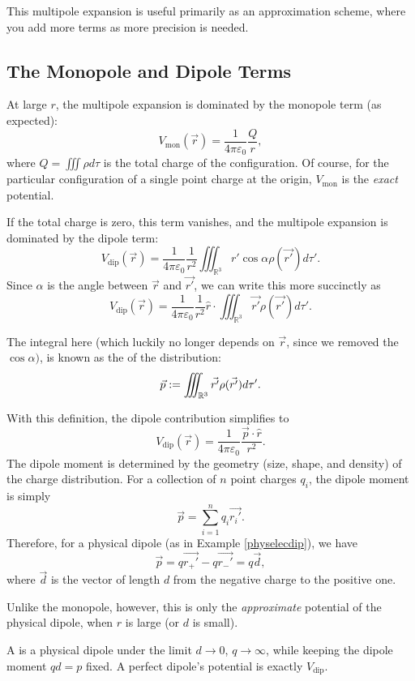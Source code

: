 This multipole expansion is useful primarily as an approximation scheme, where you add more terms as more precision is needed.

\subsection{The Monopole and Dipole Terms}

At large $r$, the multipole expansion is dominated by the monopole term (as expected):
\[V_{\text{mon}}(\vec{r})=\frac{1}{4\pi\varepsilon_0}\frac{Q}{r},\]
where $Q=\iiint \rho d\tau$ is the total charge of the configuration. Of course, for the particular configuration of a single point charge at the origin, $V_{\text{mon}}$ is the \textit{exact} potential.

If the total charge is zero, this term vanishes, and the multipole expansion is dominated by the dipole term:
\[V_{\text{dip}}(\vec{r})=\frac{1}{4\pi\varepsilon_0}\frac{1}{r^2}\iiint_{\mathbb{R}^3}r'\cos\alpha \rho(\vec{r'})d\tau'.\]
Since $\alpha$ is the angle between $\vec{r}$ and $\vec{r'}$, we can write this more succinctly as
\[V_{\text{dip}}(\vec{r})=\frac{1}{4\pi\varepsilon_0}\frac{1}{r^2}\hat{r}\cdot\iiint_{\mathbb{R}^3}\vec{r'}\rho(\vec{r'})d\tau'.\]

\begin{definition}
The integral here (which luckily no longer depends on $\vec{r}$, since we removed the $\cos\alpha)$, is known as the  of the distribution:
\[\vec{p}:=\iiint_{\mathbb R^3}\vec{r'}\rho(\vec{r'})d\tau'.\]
\end{definition}

With this definition, the dipole contribution simplifies to
\[V_{\text{dip}}(\vec{r})=\frac{1}{4\pi\varepsilon_0}\frac{\vec{p}\cdot\hat{r}}{r^2}.\]
The dipole moment is determined by the geometry (size, shape, and density) of the charge distribution. For a collection of $n$ point charges $q_i$, the dipole moment is simply
\[\vec{p}=\sum_{i=1}^n q_i\vec{r_i'}.\]
Therefore, for a physical dipole (as in Example \ref{physelecdip}), we have
\[\vec{p}=q\vec{r_+'}-q\vec{r_-'}=q\vec{d},\]
where $\vec{d}$ is the vector of length $d$ from the negative charge to the positive one.

Unlike the monopole, however, this is only the \textit{approximate} potential of the physical dipole, when $r$ is large (or $d$ is small). 

\begin{definition}
A  is a physical dipole under the limit $d\to 0$, $q\to \infty$, while keeping the dipole moment $qd=p$ fixed. A perfect dipole's potential is exactly $V_{\text{dip}}$.
\end{definition}

